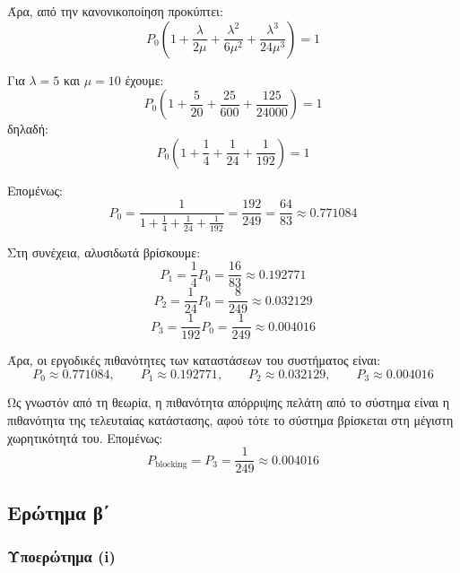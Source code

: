 \documentclass{article}
\begin{document}
Άρα, από την κανονικοποίηση προκύπτει:
\begin{equation}
P_0
\left(
1+\frac{\lambda}{2\mu}+\frac{\lambda^2}{6\mu^2}+\frac{\lambda^3}{24\mu^3}
\right)=1
\end{equation}

Για \(\lambda=5\) και \(\mu=10\) έχουμε:
\begin{equation}
P_0
\left(
1+\frac{5}{20}+\frac{25}{600}+\frac{125}{24000}
\right)=1
\end{equation}
δηλαδή:
\begin{equation}
P_0
\left(
1+\frac{1}{4}+\frac{1}{24}+\frac{1}{192}
\right)=1
\end{equation}

Επομένως:
\begin{equation}
P_0 = \frac{1}{1+\frac{1}{4}+\frac{1}{24}+\frac{1}{192}}
= \frac{192}{249}
= \frac{64}{83}
\approx 0.771084
\end{equation}

Στη συνέχεια, αλυσιδωτά βρίσκουμε:
\begin{equation}
P_1 = \frac{1}{4}P_0 = \frac{16}{83} \approx 0.192771
\end{equation}
\begin{equation}
P_2 = \frac{1}{24}P_0 = \frac{8}{249} \approx 0.032129
\end{equation}
\begin{equation}
P_3 = \frac{1}{192}P_0 = \frac{1}{249} \approx 0.004016
\end{equation}

Άρα, οι εργοδικές πιθανότητες των καταστάσεων του συστήματος είναι:
\begin{equation}
P_0 \approx 0.771084,\qquad
P_1 \approx 0.192771,\qquad
P_2 \approx 0.032129,\qquad
P_3 \approx 0.004016
\end{equation}

Ως γνωστόν από τη θεωρία, η πιθανότητα απόρριψης πελάτη από το σύστημα είναι
η πιθανότητα της τελευταίας κατάστασης, αφού τότε το σύστημα βρίσκεται στη
μέγιστη χωρητικότητά του. Επομένως:
\begin{equation}
P_{\text{blocking}} = P_3 = \frac{1}{249} \approx 0.004016
\end{equation}

\subsection{Ερώτημα β΄}

\subsubsection{Υποερώτημα (i)}
\end{document}

